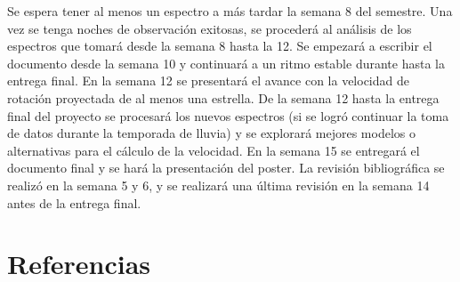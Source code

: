 \documentclass[notitlepage,letterpaper,12pt]{article} %
\begin{document}

Se espera tener al menos un espectro a más tardar la semana 8 del semestre. Una vez se tenga noches de observación exitosas, se procederá al análisis de los espectros que tomará desde la semana 8 hasta la 12. Se empezará a escribir el documento desde la semana 10 y continuará a un ritmo estable durante hasta la entrega final. En la semana 12 se presentará el avance con la velocidad de rotación proyectada de al menos una estrella. De la semana 12 hasta la entrega final del proyecto se procesará los nuevos espectros (si se logró continuar la toma de datos durante la temporada de lluvia) y se explorará mejores modelos o alternativas para el cálculo de la velocidad. En la semana 15 se entregará el documento final y se hará la presentación del poster. La revisión bibliográfica se realizó en la semana 5 y 6, y se realizará una última revisión en la semana 14 antes de la entrega final.




\section{Referencias}
\printbibliography[heading=none]
\end{document}
